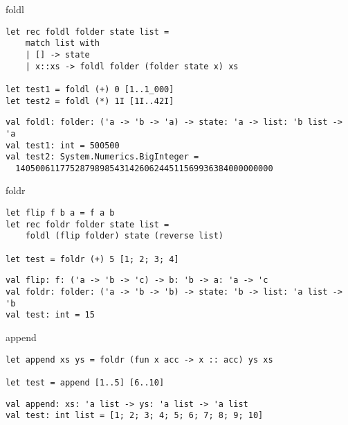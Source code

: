 \documentclass[t]{beamer}
\begin{document}
\begin{frame}[label={sec:org2265587},fragile]{foldl}
 \begin{verbatim}
let rec foldl folder state list = 
    match list with
    | [] -> state
    | x::xs -> foldl folder (folder state x) xs

let test1 = foldl (+) 0 [1..1_000]
let test2 = foldl (*) 1I [1I..42I]
\end{verbatim}

\begin{verbatim}
val foldl: folder: ('a -> 'b -> 'a) -> state: 'a -> list: 'b list -> 'a
val test1: int = 500500
val test2: System.Numerics.BigInteger =
  1405006117752879898543142606244511569936384000000000
\end{verbatim}
\end{frame}

\begin{frame}[label={sec:org59aa839},fragile]{foldr}
 \begin{verbatim}
let flip f b a = f a b 
let rec foldr folder state list = 
    foldl (flip folder) state (reverse list)

let test = foldr (+) 5 [1; 2; 3; 4]
\end{verbatim}

\begin{verbatim}
val flip: f: ('a -> 'b -> 'c) -> b: 'b -> a: 'a -> 'c
val foldr: folder: ('a -> 'b -> 'b) -> state: 'b -> list: 'a list -> 'b
val test: int = 15
\end{verbatim}
\end{frame}

\begin{frame}[label={sec:org5642cac},fragile]{append}
 \begin{verbatim}
let append xs ys = foldr (fun x acc -> x :: acc) ys xs

let test = append [1..5] [6..10] 
\end{verbatim}

\begin{verbatim}
val append: xs: 'a list -> ys: 'a list -> 'a list
val test: int list = [1; 2; 3; 4; 5; 6; 7; 8; 9; 10]
\end{verbatim}
\end{frame}
\end{document}
